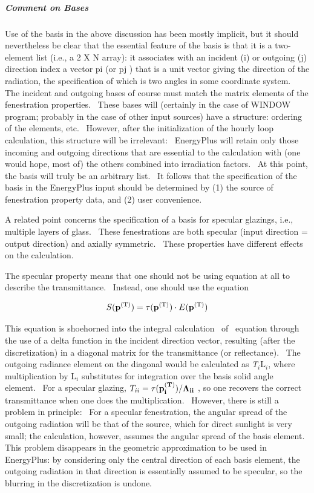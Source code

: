 \subparagraph{Comment on Bases}\label{comment-on-bases}

Use of the basis in the above discussion has been mostly implicit, but it should nevertheless be clear that the essential feature of the basis is that it is a two-element list (i.e., a 2 X N array): it associates with an incident (i) or outgoing (j) direction index a vector pi (or pj ) that is a unit vector giving the direction of the radiation, the specification of which is two angles in some coordinate system.~ The incident and outgoing bases of course must match the matrix elements of the fenestration properties.~ These bases will (certainly in the case of WINDOW program; probably in the case of other input sources) have a structure: ordering of the elements, etc.~ However, after the initialization of the hourly loop calculation, this structure will be irrelevant:~ EnergyPlus will retain only those incoming and outgoing directions that are essential to the calculation with (one would hope, most of) the others combined into irradiation factors.~ At this point, the basis will truly be an arbitrary list.~ It follows that the specification of the basis in the EnergyPlus input should be determined by (1) the source of fenestration property data, and (2) user convenience.

A related point concerns the specification of a basis for specular glazings, i.e., multiple layers of glass.~ These fenestrations are both specular (input direction = output direction) and axially symmetric.~ These properties have different effects on the calculation.

The specular property means that one should not be using equation at all to describe the transmittance.~ Instead, one should use the equation

\begin{equation}
S({{\bf{p}}^{{\rm{(T)}}}}) = \tau ({{\bf{p}}^{{\rm{(T)}}}}) \cdot E({{\bf{p}}^{{\rm{(T)}}}})
\end{equation}

This equation is shoehorned into the integral calculation~ of~ equation through the use of a delta function in the incident direction vector, resulting (after the discretization) in a diagonal matrix for the transmittance (or reflectance).~ The outgoing radiance element on the diagonal would be calculated as \emph{T\(_{i}\)}L\emph{\(_{i}\)}, where multiplication by L\emph{\(_{i}\)} substitutes for integration over the basis solid angle element.~ For a specular glazing, \(T_{ii} = \tau(\bf{p}_i^{(T)})/\Lambda_{ii}\) , so one recovers the correct transmittance when one does the multiplication.~ However, there is still a problem in principle:~ For a specular fenestration, the angular spread of the outgoing radiation will be that of the source, which for direct sunlight is very small; the calculation, however, assumes the angular spread of the basis element.~ This problem disappears in the geometric approximation to be used in EnergyPlus: by considering only the central direction of each basis element, the outgoing radiation in that direction is essentially assumed to be specular, so the blurring in the discretization is undone.

